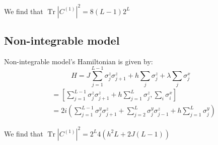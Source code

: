 \documentclass[11pt,a4paper]{article}
\DeclareMathOperator{\Tr}{Tr}
\begin{document}
We find that $\Tr |C^{(1)}|^2 = 8 (L-1)2^L$ 

\subsection{Non-integrable model}
Non-integrable model's Hamiltonian is given by: 
\begin{equation}
H= J \sum_{j=1}^{L-1} \sigma_j^z \sigma_{j+1}^z + h\sum_{j} \sigma_j^z +\lambda \sum_{j} \sigma_j^x 
\end{equation}
\begin{align*}
[H,\partial_{\lambda}H] & =  [\sum_{j=1}^{L-1} \sigma_j^z \sigma_{j+1}^z + h\sum_{j=1}^{L} \sigma_j^z, \sum_{i} \sigma_i^x]  \\
&= 2i \left(\sum_{j=1}^{L-1} \sigma_j^y \sigma_{j+1}^z + \sum_{j=2}^{L} \sigma_j^y \sigma_{j-1}^z + h \sum_{j=1}^{L}\sigma_j^y \right) 
\end{align*}


We find that $\Tr |C^{(1)}|^2 = 2^L 4(h^2 L + 2J(L-1))$ 



 


%
\end{document}
